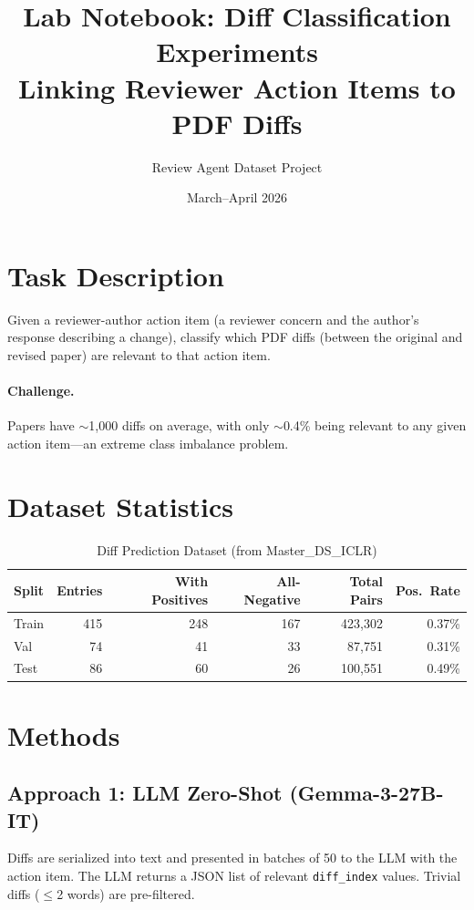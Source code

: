 \documentclass[11pt]{article}
\title{Lab Notebook: Diff Classification Experiments\\
\large Linking Reviewer Action Items to PDF Diffs}
\author{Review Agent Dataset Project}
\date{March--April 2026}
\begin{document}
\maketitle

\section{Task Description}
Given a reviewer-author action item (a reviewer concern and the author's response describing a change), classify which PDF diffs (between the original and revised paper) are relevant to that action item.

\paragraph{Challenge.} Papers have $\sim$1{,}000 diffs on average, with only $\sim$0.4\% being relevant to any given action item---an extreme class imbalance problem.

\section{Dataset Statistics}

\begin{table}[h]
\centering
\caption{Diff Prediction Dataset (from Master\_DS\_ICLR)}
\label{tab:data_stats}
\begin{tabular}{lrrrrr}
\toprule
Split & Entries & With Positives & All-Negative & Total Pairs & Pos.\ Rate \\
\midrule
Train & 415 & 248 & 167 & 423{,}302 & 0.37\% \\
Val   & 74  & 41  & 33  & 87{,}751  & 0.31\% \\
Test  & 86  & 60  & 26  & 100{,}551 & 0.49\% \\
\bottomrule
\end{tabular}
\end{table}

\section{Methods}

\subsection{Approach 1: LLM Zero-Shot (Gemma-3-27B-IT)}
Diffs are serialized into text and presented in batches of 50 to the LLM with the action item. The LLM returns a JSON list of relevant \texttt{diff\_index} values. Trivial diffs ($\leq$2 words) are pre-filtered.
\end{document}
